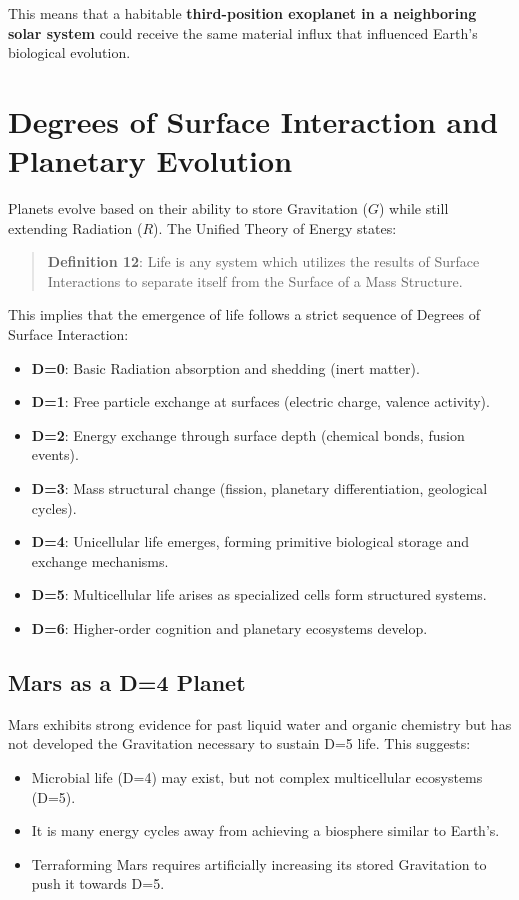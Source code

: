 \documentclass{article}
\begin{document}
This means that a habitable \textbf{third-position exoplanet in a neighboring solar system} could receive the same material influx that influenced Earth's biological evolution.

\section{Degrees of Surface Interaction and Planetary Evolution}
Planets evolve based on their ability to store Gravitation ($G$) while still extending Radiation ($R$). The Unified Theory of Energy states:
\begin{quotation}
\textbf{Definition 12}: Life is any system which utilizes the results of Surface Interactions to separate itself from the Surface of a Mass Structure.
\end{quotation}

This implies that the emergence of life follows a strict sequence of Degrees of Surface Interaction:
\begin{itemize}
    \item \textbf{D=0}: Basic Radiation absorption and shedding (inert matter).
    \item \textbf{D=1}: Free particle exchange at surfaces (electric charge, valence activity).
    \item \textbf{D=2}: Energy exchange through surface depth (chemical bonds, fusion events).
    \item \textbf{D=3}: Mass structural change (fission, planetary differentiation, geological cycles).
    \item \textbf{D=4}: Unicellular life emerges, forming primitive biological storage and exchange mechanisms.
    \item \textbf{D=5}: Multicellular life arises as specialized cells form structured systems.
    \item \textbf{D=6}: Higher-order cognition and planetary ecosystems develop.
\end{itemize}

\subsection{Mars as a D=4 Planet}
Mars exhibits strong evidence for past liquid water and organic chemistry but has not developed the Gravitation necessary to sustain D=5 life. This suggests:
\begin{itemize}
    \item Microbial life (D=4) may exist, but not complex multicellular ecosystems (D=5).
    \item It is many energy cycles away from achieving a biosphere similar to Earth's.
    \item Terraforming Mars requires artificially increasing its stored Gravitation to push it towards D=5.
\end{itemize}
\end{document}
